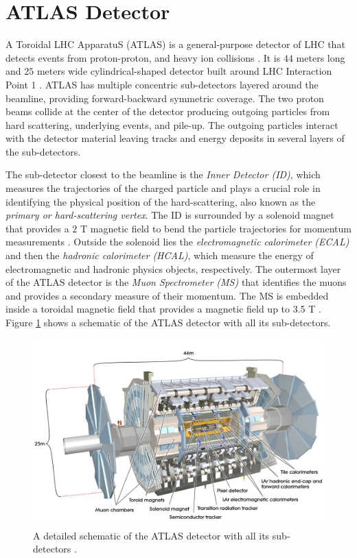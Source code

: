 \section{ATLAS Detector}
\label{sec:ATLAS}

A Toroidal LHC ApparatuS (ATLAS) is a general-purpose detector of LHC that detects events from proton-proton, and heavy ion collisions \cite{ATLAS}. It is $44$ meters long and $25$ meters wide cylindrical-shaped detector built around LHC Interaction Point 1 \cite{ATLAS}. ATLAS has multiple concentric sub-detectors layered around the beamline, providing forward-backward symmetric coverage. The two proton beams collide at the center of the detector producing outgoing particles from hard scattering, underlying events, and pile-up. The outgoing particles interact with the detector material leaving tracks and energy deposits in several layers of the sub-detectors. 

The sub-detector closest to the beamline is the \textit{Inner Detector (ID)}, which measures the trajectories of the charged particle and plays a crucial role in identifying the physical position of the hard-scattering, also known as the \textit{primary or hard-scattering vertex}. The ID is surrounded by a solenoid magnet that provides a $2$ T magnetic field to bend the particle trajectories for momentum measurements \cite{ATLAS}. Outside the solenoid lies the \textit{electromagnetic calorimeter (ECAL)} and then the \textit{hadronic calorimeter (HCAL)}, which measure the energy of electromagnetic and hadronic physics objects, respectively. The outermost layer of the ATLAS detector is the \textit{Muon Spectrometer (MS)} that identifies the muons and provides a secondary measure of their momentum. The MS is embedded inside a toroidal magnetic field that provides a magnetic field up to 3.5 T \cite{ATLAS}. Figure \ref{fig:ATLAS} shows a schematic of the ATLAS detector with all its sub-detectors.

\begin{figure}[!htbp]
    \centering
    \includegraphics[width=.98\linewidth]{figures/LHC/AtlasDetector.png}
    \caption{ A detailed schematic of the ATLAS detector with all its sub-detectors \cite{ATLAS}.\label{fig:ATLAS}}
\end{figure}

